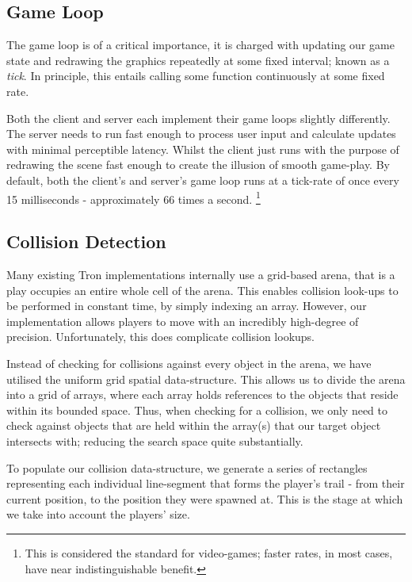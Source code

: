 \documentclass{standalone}
\begin{document}
		\subsection{Game Loop}
			The game loop is of a critical importance, it is charged with updating our game state and redrawing the graphics repeatedly at some fixed interval; known as a \emph{tick}. In principle, this entails calling some function continuously at some fixed rate.

			Both the client and server each implement their game loops slightly differently. The server needs to run fast enough to process user input and calculate updates with minimal perceptible latency. Whilst the client just runs with the purpose of redrawing the scene fast enough to create the illusion of smooth game-play. By default, both the client's and server's game loop runs at a tick-rate of once every 15 milliseconds - approximately 66 times a second. \footnote{This is considered the standard for video-games; faster rates, in most cases, have near indistinguishable benefit.}

		\subsection{Collision Detection} \label{collisionDetection}
			Many existing Tron implementations internally use a grid-based arena, that is a play occupies an entire whole cell of the arena. This enables collision look-ups to be performed in constant time, by simply indexing an array. However, our implementation allows players to move with an incredibly high-degree of precision\parencite{JsNumbers}. Unfortunately, this does complicate collision lookups.

			Instead of checking for collisions against every object in the arena, we have utilised the uniform grid spatial data-structure. This allows us to divide the arena into a grid of arrays, where each array holds references to the objects that reside within its bounded space. Thus, when checking for a collision, we only need to check against objects that are held within the array(s) that our target object intersects with; reducing the search space quite substantially.

			To populate our collision data-structure, we generate a series of rectangles representing each individual line-segment that forms the player's trail - from their current position, to the position they were spawned at. This is the stage at which we take into account the players' size.
\end{document}
